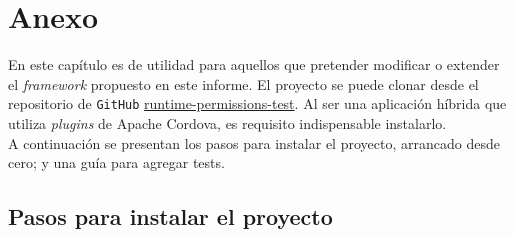 \chapter*{Anexo}
En este capítulo es de utilidad para aquellos que pretender modificar o extender el \emph{framework} propuesto en este informe. El proyecto se puede clonar desde el repositorio de \texttt{GitHub} \href{https://github.com/rgaluppo/runtime_permissions_test}{runtime-permissions-test}. Al ser una aplicación híbrida que utiliza \emph{plugins} de Apache Cordova, es requisito indispensable instalarlo.\\

A continuación se presentan los pasos para instalar el proyecto, arrancado desde cero; y una guía para agregar tests.
\section*{Pasos para instalar el proyecto}
